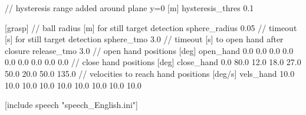 \begin{DoxyCode}
\textcolor{comment}{// hysteresis range added around plane y=0 [m]}
hysteresis\_thres 0.1

[grasp]
\textcolor{comment}{// ball radius [m] for still target detection}
sphere\_radius   0.05
\textcolor{comment}{// timeout [s] for still target detection}
sphere\_tmo      3.0
\textcolor{comment}{// timeout [s] to open hand after closure}
release\_tmo     3.0
\textcolor{comment}{// open hand positions [deg]}
open\_hand       0.0 0.0 0.0   0.0   0.0 0.0 0.0   0.0   0.0
\textcolor{comment}{// close hand positions [deg]}
close\_hand      0.0 80.0 12.0 18.0 27.0 50.0 20.0  50.0 135.0
\textcolor{comment}{// velocities to reach hand positions [deg/s]}
vels\_hand       10.0 10.0  10.0 10.0 10.0 10.0 10.0 10.0  10.0

[include speech \textcolor{stringliteral}{"speech\_English.ini"}]
\end{DoxyCode}



